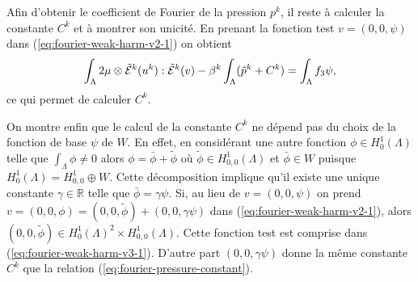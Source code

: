 Afin d'obtenir le coefficient de Fourier de la pression $p^k$, il
reste à calculer la constante $C^k$ et à montrer son unicité. En
prenant la fonction test $v = (0,0,\psi)$ dans
(\ref{eq:fourier-weak-harm-v2-1}) on obtient
\begin{align}
\int_\Lambda 2\mu\otimes
\tilde{\mathcal E}^k(u^k):\tilde{\mathcal E}^k(v) -
\beta^k\int_\Lambda (\tilde p^k + C^k) = \int_\Lambda f_3 \psi, \label{eq:fourier-pressure-constant}
\end{align}
ce qui permet de calculer $C^k$.

On montre enfin que le calcul de la constante $C^k$ ne dépend pas du
choix de la fonction de base $\psi$ de $W$. En effet, en considérant
une autre fonction $\phi \in H^1_0(\Lambda)$ telle que $\int_\Lambda
\phi \neq 0$ alors $\phi = \bar\phi + \tilde \phi$ où $\tilde \phi \in
H^1_{0,0}(\Lambda)$ et $\bar \phi \in W$ puisque $H^1_0(\Lambda) =
H^1_{0,0} \oplus W$. Cette décomposition implique qu'il existe une
unique constante $\gamma \in \mathbb R$ telle que $\bar \phi = \gamma
\psi$. Si, au lieu de $v = (0,0,\psi)$ on prend $v = (0,0,\phi) =
(0,0,\tilde \phi) + (0,0,\gamma \psi)$ dans
(\ref{eq:fourier-weak-harm-v2-1}), alors $(0,0,\tilde \phi) \in
H^1_0(\Lambda)^2\times H^1_{0,0}(\Lambda)$. Cette fonction test est
comprise dans (\ref{eq:fourier-weak-harm-v3-1}). D'autre part
$(0,0,\gamma \psi)$ donne la même constante $C^k$ que la relation
(\ref{eq:fourier-pressure-constant}).
